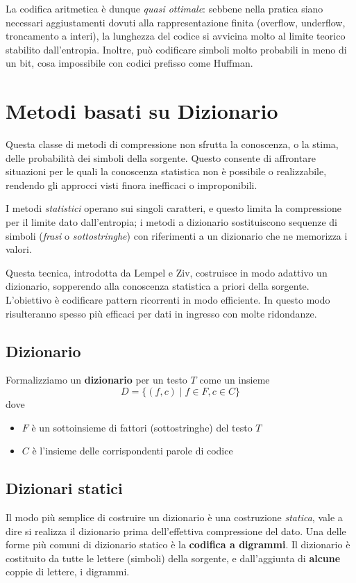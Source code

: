 La codifica aritmetica è dunque \textit{quasi ottimale}: sebbene nella pratica siano necessari aggiustamenti dovuti alla rappresentazione finita (overflow, underflow, troncamento a interi), la lunghezza del codice si avvicina molto al limite teorico stabilito dall'entropia. Inoltre, può codificare simboli molto probabili in meno di un bit, cosa impossibile con codici prefisso come Huffman.



\section{Metodi basati su Dizionario}
Questa classe di metodi di compressione non sfrutta la conoscenza, o la stima, delle probabilità dei simboli della sorgente. Questo consente di affrontare situazioni per le quali la conoscenza statistica non è possibile o realizzabile, rendendo gli approcci visti finora inefficaci o improponibili.

I metodi \textit{statistici} operano sui singoli caratteri, e questo limita la compressione per il limite dato dall'entropia; i metodi a dizionario sostituiscono sequenze di simboli (\textit{frasi} o \textit{sottostringhe}) con riferimenti a un dizionario che ne memorizza i valori.

Questa tecnica, introdotta da Lempel e Ziv, costruisce in modo adattivo un dizionario, sopperendo alla conoscenza statistica a priori della sorgente. L'obiettivo è codificare pattern ricorrenti in modo efficiente. In questo modo risulteranno spesso più efficaci per dati in ingresso con molte ridondanze.

\subsection{Dizionario}
Formalizziamo un \textbf{dizionario} per un testo $T$ come un insieme 
\[D = \{(f,c) \mid f \in F, c \in C\}\]
dove
\begin{itemize}
    \item $F$ è un sottoinsieme di fattori (sottostringhe) del testo $T$
    \item $C$ è l'insieme delle corrispondenti parole di codice
\end{itemize}

\subsection{Dizionari statici}
Il modo più semplice di costruire un dizionario è una costruzione \textit{statica}, vale a dire si realizza il dizionario prima dell'effettiva compressione del dato.
Una delle forme più comuni di dizionario statico è la \textbf{codifica a digrammi}.
Il dizionario è costituito da tutte le lettere (simboli) della sorgente, e dall'aggiunta di \textbf{alcune} coppie di lettere, i digrammi.


